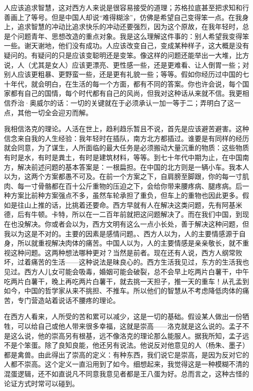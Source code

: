 人应该追求智慧，这对西方人来说是很容易接受的道理；苏格拉底甚至把求知和行善画上了等号。但是中国人却说“难得糊涂”，仿佛是希望自己变得笨一点。在我身上，追求智慧的冲动比追求快乐的冲动还要强烈，因为这个原故，在我年轻时，总是个问题青年、思想改造的重点对象。我是这么理解这件事的：别人希望我变得笨一些。谢天谢地，他们没有成功。人应该改变自己，变成某种样子，这大概是没有疑问的。有疑问的只是应该变聪明还是变笨。像这样的问题还能举出一大堆，比方说，人（尤其是女人）应该更漂亮、更性感一些，还是更难看、让人倒胃一些；对别人应该更粗暴、更野蛮一些，还是更有礼貌一些；等等。假如你经历过中国的七十年代，就会明白，在生活的每一个方面，都有不同的答案。你也许会说，每个国家都有自己的国情，每个时代都有自己的风尚，但我对这种话从来就不信。我更相信乔治·奥威尔的话：一切的关键就在于必须承认一加一等于二；弄明白了这一点，其他一切全会迎刃而解。 

我相信洛克的理论。人活在世上，趋利趋乐暂且不说，首先是应该避苦避害。这种信念来自我的人生经验：我年轻时在插队，南方北方都插过。谁要是有同样的经历就会同意，为了谋生，人所面临的最大任务是必须搬动大量沉重的物质：这些物质有时是水，有时是粪土，有时是建筑材料，等等。到七十年代中期为止，在中国南方，解决前述问题的基本答案是：一根扁担。在中国的北方则是一辆小车。我本人以为，这两个方案都愚不可及。在前一个方案之下，自肩膀至脚跟，你的每一寸肌肉、每一寸骨骼都在百十公斤重物的压迫之下，会给你带来腰疼病、腿疼病。后一种方案比前种方案强点不多，虽然车轮承担了重负，但车上的重物也因此更多。假如是往山上推的话，比挑着还要命。西方早就有人在解决这类问题，先有阿基米德，后有牛顿。卡特，所以在一二百年前就把这问题解决了。而在我们中国，到现在也没解决。你或者会以为，西方文明有这么一点小长处，善于解决这种问题，但我以为这是不对的。主要的因素是感情问题。、西方人以为，人的主要情感源于自身，所以就重视解决肉体的痛苦。中国人以为，人的主要情感是亲亲敬长，就不重视这种问题。这两种想法哪种更对？当然是前者。现在还有人说，西方人纲常败坏，过着痛苦的生活——这种说法是昧良心的。西方生活我见过，东方的生活我也见过。西方人儿女可能会吸毒，婚姻可能会破裂，总不会早上吃两片白薯干，中午吃两片白薯干，晚上再吃两片白薯干，就去挑一天担子，推一天的重车！从孔孟到如今，中国的哲学家从来不挑担、不推车。所以他们的智慧从不考虑降低肉体的痛苦，专门营造站着说话不腰疼的理论。 

在西方人看来，人所受的苦和累可以减少，这是一切的基础。假设某人做出一份牺牲，可以给自己或他人带来很多幸福，这就是崇高——洛克就是这么说的。孟子不是这么说，他的崇高另有根基，远不像洛克的理论那么能服人。据我所知，孟子远不是个笨蛋。除了良知良能，他还另有说法。他说反对他意见的人（杨朱、墨子）都是禽兽。由此得出了崇高的定义：有种东西，我们说它是崇高，是因为反对它的人都不崇高。这个定义一直沿用到了如今。细想起来，我觉得这是一种模糊不清的混蛋逻辑，还不如直说凡不同意我意见者都是王八蛋为好。总而言之，这种古怪的论证方式时常可以碰到。 

